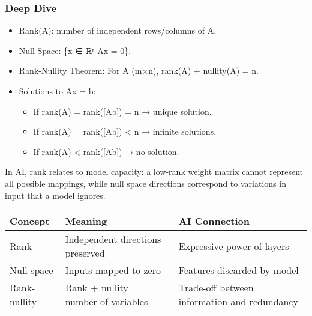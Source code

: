 \documentclass[
  letterpaper,
  DIV=11,
  numbers=noendperiod]{scrreprt}
\providecommand{\tightlist}{%
  \setlength{\itemsep}{0pt}\setlength{\parskip}{0pt}}
\begin{document}
\subsubsection{Deep Dive}\label{deep-dive-104}

\begin{itemize}
\item
  Rank(A): number of independent rows/columns of A.
\item
  Null Space: \{x ∈ ℝⁿ \textbar{} Ax = 0\}.
\item
  Rank-Nullity Theorem: For A (m×n), rank(A) + nullity(A) = n.
\item
  Solutions to Ax = b:

  \begin{itemize}
  \tightlist
  \item
    If rank(A) = rank({[}A\textbar b{]}) = n → unique solution.
  \item
    If rank(A) = rank({[}A\textbar b{]}) \textless{} n → infinite
    solutions.
  \item
    If rank(A) \textless{} rank({[}A\textbar b{]}) → no solution.
  \end{itemize}
\end{itemize}

In AI, rank relates to model capacity: a low-rank weight matrix cannot
represent all possible mappings, while null space directions correspond
to variations in input that a model ignores.

\begin{longtable}[]{@{}
  >{\raggedright\arraybackslash}p{}
  >{\raggedright\arraybackslash}p{}
  >{\raggedright\arraybackslash}p{}@{}}
\toprule\noalign{}
\begin{minipage}[b]{\linewidth}\raggedright
Concept
\end{minipage} & \begin{minipage}[b]{\linewidth}\raggedright
Meaning
\end{minipage} & \begin{minipage}[b]{\linewidth}\raggedright
AI Connection
\end{minipage} \\
\midrule\noalign{}
\endhead
\bottomrule\noalign{}
\endlastfoot
Rank & Independent directions preserved & Expressive power of layers \\
Null space & Inputs mapped to zero & Features discarded by model \\
Rank-nullity & Rank + nullity = number of variables & Trade-off between
information and redundancy \\
\end{longtable}
\end{document}
